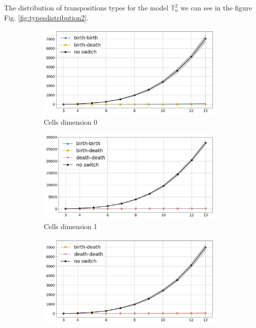 \documentclass{article}
\begin{document}
\par The distribution of transpositions types for the model $\mathbb{T}^{2}_n$ we can see in the figure Fig. \ref{fig:typesdistribution2}.
\begin{figure}[htbp]
\centering
\begin{subfigure}[b]{0.3\textwidth}
    \includegraphics[width=\linewidth]{pics/torus-transpositions-extended/transposition-types-complex-dim2-subposet-dim0-drop-no-switches-False.png}
    \caption{Cells dimension 0}
    \label{fig:complex2cells0}
\end{subfigure}
\hfill
\begin{subfigure}[b]{0.3\textwidth}
    \includegraphics[width=\linewidth]{pics/torus-transpositions-extended/transposition-types-complex-dim2-subposet-dim1-drop-no-switches-False.png}
    \caption{Cells dimension 1}
    \label{fig:complex2cells1}
\end{subfigure}
\hfill
\begin{subfigure}[b]{0.3\textwidth}
    \includegraphics[width=\linewidth]{pics/torus-transpositions-extended/transposition-types-complex-dim2-subposet-dim2-drop-no-switches-False.png}

\end{subfigure}
\end{figure}
\end{document}
